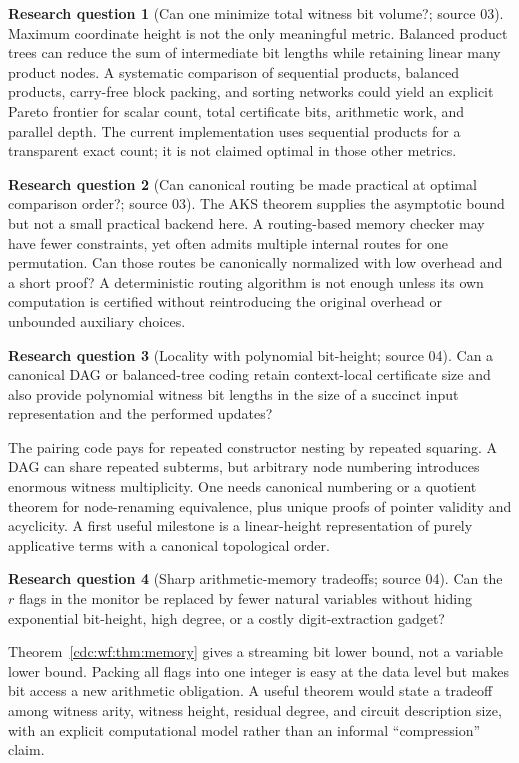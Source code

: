 \documentclass[11pt,a4paper]{article}
\theoremstyle{definition}
\newtheorem{question}[question]{Research question}
\theoremstyle{remark}
\begin{document}
\begin{question}[Can one minimize total witness bit volume?; source 03]
Maximum coordinate height is not the only meaningful metric. Balanced product
trees can reduce the sum of intermediate bit lengths while retaining linear
many product nodes. A systematic comparison of sequential products, balanced
products, carry-free block packing, and sorting networks could yield an explicit
Pareto frontier for scalar count, total certificate bits, arithmetic work, and
parallel depth. The current implementation uses sequential products for a
transparent exact count; it is not claimed optimal in those other metrics.
\end{question}

\begin{question}[Can canonical routing be made practical at optimal comparison order?; source 03]
The AKS theorem supplies the asymptotic bound but not a small practical backend
here. A routing-based memory checker may have fewer constraints, yet often
admits multiple internal routes for one permutation. Can those routes be
canonically normalized with low overhead and a short proof? A deterministic
routing algorithm is not enough unless its own computation is certified without
reintroducing the original overhead or unbounded auxiliary choices.
\end{question}

\begin{question}[Locality with polynomial bit-height; source 04]
Can a canonical DAG or balanced-tree coding retain context-local certificate size and also provide polynomial witness bit lengths in the size of a succinct input representation and the performed updates?
\end{question}
The pairing code pays for repeated constructor nesting by repeated squaring. A DAG can share repeated subterms, but arbitrary node numbering introduces enormous witness multiplicity. One needs canonical numbering or a quotient theorem for node-renaming equivalence, plus unique proofs of pointer validity and acyclicity. A first useful milestone is a linear-height representation of purely applicative terms with a canonical topological order.

\begin{question}[Sharp arithmetic-memory tradeoffs; source 04]
Can the $r$ flags in the monitor be replaced by fewer natural variables without hiding exponential bit-height, high degree, or a costly digit-extraction gadget?
\end{question}
Theorem~\ref{cdc:wf:thm:memory} gives a streaming bit lower bound, not a variable lower bound. Packing all flags into one integer is easy at the data level but makes bit access a new arithmetic obligation. A useful theorem would state a tradeoff among witness arity, witness height, residual degree, and circuit description size, with an explicit computational model rather than an informal ``compression'' claim.
\end{document}
